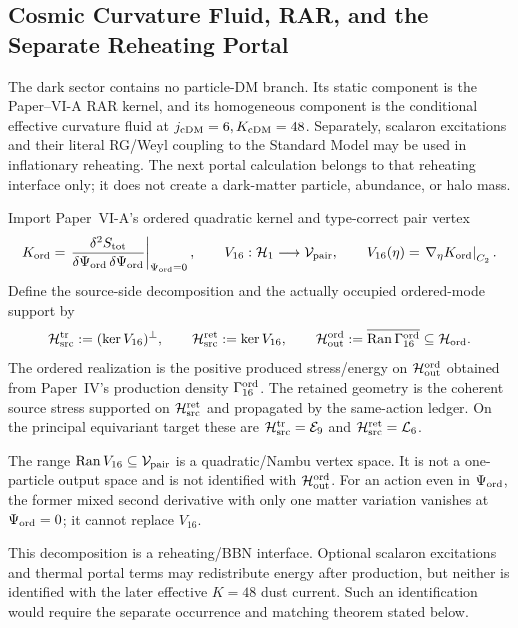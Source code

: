\documentclass[12pt,a4paper]{article}
\begin{document}
\label{p9:part:scalaron-readouts}

\subsection{Cosmic Curvature Fluid, RAR, and the Separate Reheating Portal}
\label{p9:sec:portal-closed}
The dark sector contains no particle-DM branch.  Its static component is the
Paper--VI-A RAR kernel, and its homogeneous component is the conditional
effective curvature fluid at \(j_{\rm cDM}=6, K_{\rm cDM}=48\).  Separately,
scalaron excitations and their literal RG/Weyl coupling to the Standard Model
may be used in inflationary reheating.  The next portal calculation belongs to
that reheating interface only; it does not create a dark-matter particle,
abundance, or halo mass.

\begin{definition}
\label{p9:def:ordered-realization-retained-geometry}
Import Paper~VI-A's ordered quadratic kernel and type-correct pair vertex
\[
 K_{\rm ord}
 =\left.\frac{\delta^2S_{\rm tot}}
 {\delta\Psi_{\rm ord}\,\delta\Psi_{\rm ord}}
 \right|_{\Psi_{\rm ord}=0},
 \qquad
 V_{16}:\mathcal H_1\longrightarrow\mathcal V_{\rm pair},
 \qquad
 V_{16}(\eta)=\left.\nabla_\eta K_{\rm ord}\right|_{C_2}.
\]
Define the source-side decomposition and the actually occupied ordered-mode
support by
\begin{equation}
\label{p9:eq:vertex-source-and-occupation-support}
 \mathcal H_{\rm src}^{\rm tr}:=(\ker V_{16})^\perp,
 \qquad
 \mathcal H_{\rm src}^{\rm ret}:=\ker V_{16},
 \qquad
 \mathcal H_{\rm out}^{\rm ord}
 :=\overline{\operatorname{Ran}\Gamma_{16}^{\rm ord}}
 \subseteq\mathcal H_{\rm ord}.
\end{equation}
The ordered realization is the positive produced stress/energy on
\(\mathcal H_{\rm out}^{\rm ord}\) obtained from Paper~IV's production
density \(\Gamma_{16}^{\rm ord}\).  The retained geometry is the coherent
source stress supported on \(\mathcal H_{\rm src}^{\rm ret}\) and propagated
by the same-action ledger.  On the principal equivariant target these are
\(\mathcal H_{\rm src}^{\rm tr}=\mathcal E_9\) and
\(\mathcal H_{\rm src}^{\rm ret}=\mathcal L_6\).

The range \(\operatorname{Ran}V_{16}\subseteq\mathcal V_{\rm pair}\) is a
quadratic/Nambu vertex space.  It is not a one-particle output space and is
not identified with \(\mathcal H_{\rm out}^{\rm ord}\).  For an action even
in \(\Psi_{\rm ord}\), the former mixed second derivative with only one
matter variation vanishes at \(\Psi_{\rm ord}=0\); it cannot replace
\(V_{16}\).

This decomposition is a reheating/BBN interface.  Optional scalaron
excitations and thermal portal terms may redistribute energy after production,
but neither is identified with the later effective \(K=48\) dust current.
Such an identification would require the separate occurrence and matching
theorem stated below.
\end{definition}
\end{document}
